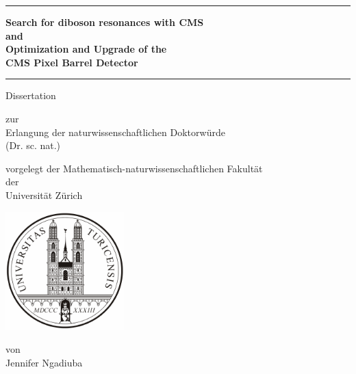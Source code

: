 

\begin{center}

  \thispagestyle{empty}
  {\parindent0cm
   \rule{\linewidth}{.7ex}}
  \begin{center}

    \bfseries\LARGE
    Search for diboson resonances with CMS\\ 
    and\\ 
    Optimization and Upgrade of the\\ 
    CMS Pixel Barrel Detector
  \end{center}
  \rule{\linewidth}{.7ex}

\par
\vspace{0.4 in}

{\LARGE Dissertation}
\vspace{0.1in}

zur \\
Erlangung der 
naturwissenschaftlichen Doktorw\"urde \\
(Dr. sc. nat.) \\
\par
\vspace{0.1in}


vorgelegt der Mathematisch-naturwissenschaftlichen Fakult\"at \\
der \\
\vspace{0.05in}
{\LARGE Universit\"at Z\"urich}
\par
\vspace{0.3in}

\includegraphics[width=1.8in]{zurich_logo}

\vspace{0.3in}
von \\
\vspace{0.05in}
{\LARGE Jennifer Ngadiuba} \\
\par
\vspace{0.4in}



\end{center}
